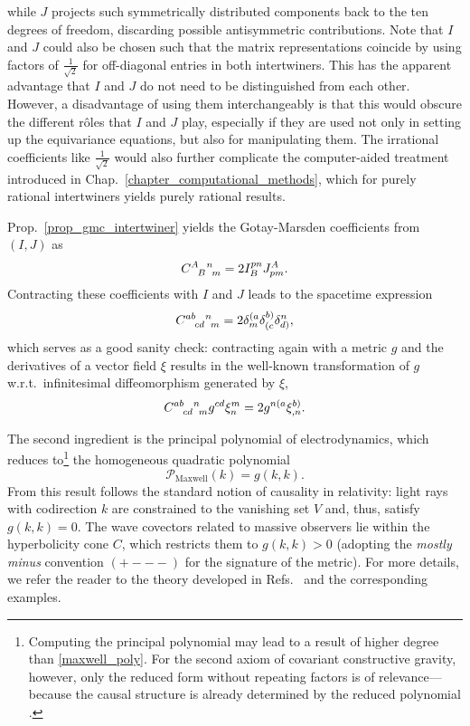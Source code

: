 while $J$ projects such symmetrically distributed components back to the ten degrees of freedom, discarding possible antisymmetric contributions. Note that $I$ and $J$ could also be chosen such that the matrix representations coincide by using factors of $\frac{1}{\sqrt 2}$ for off-diagonal entries in both intertwiners. This has the apparent advantage that $I$ and $J$ do not need to be distinguished from each other. However, a disadvantage of using them interchangeably is that this would obscure the different r\^oles that $I$ and $J$ play, especially if they are used not only in setting up the equivariance equations, but also for manipulating them. The irrational coefficients like $\frac{1}{\sqrt 2}$ would also further complicate the computer-aided treatment introduced in Chap.~\ref{chapter_computational_methods}, which for purely rational intertwiners yields purely rational results.

Prop.~\ref{prop_gmc_intertwiner} yields the Gotay-Marsden coefficients from $(I,J)$ as
\begin{equation}\label{gmc_metric}
  \gmc{A}{B}{n}{m} = 2 I^{pn}_B J^A_{pm}.
\end{equation}
Contracting these coefficients with $I$ and $J$ leads to the spacetime expression
\begin{equation}
  \gmc{ab}{cd}{n}{m} = 2 \delta^{(a}_m \delta^{b)}_{(c} \delta^n_{d)},
\end{equation}
which serves as a good sanity check: contracting again with a metric $g$ and the derivatives of a vector field $\xi$ results in the well-known transformation of $g$ w.r.t.\ infinitesimal diffeomorphism generated by $\xi$,
\begin{equation}
  \gmc{ab}{cd}{n}{m} g^{cd} \xi^m_n = 2g^{n(a} \xi^{b)}_{,n}.
\end{equation}

The second ingredient is the principal polynomial of electrodynamics, which reduces to\footnote{Computing the principal polynomial may lead to a result of higher degree than \eqref{maxwell_poly}. For the second axiom of covariant constructive gravity, however, only the reduced form without repeating factors is of relevance---because the causal structure is already determined by the reduced polynomial \cite{R_tzel_2011}.} the homogeneous quadratic polynomial \cite{R_tzel_2011}
\begin{equation}\label{maxwell_poly}
  \mathcal P_\text{Maxwell}(k) = g(k,k).
\end{equation}
From this result follows the standard notion of causality in relativity: light rays with codirection $k$ are constrained to the vanishing set $V$ and, thus, satisfy $g(k,k)=0$. The wave covectors related to massive observers lie within the hyperbolicity cone $C$, which restricts them to $g(k,k) > 0$ (adopting the \emph{mostly minus} convention $(+---)$ for the signature of the metric). For more details, we refer the reader to the theory developed in Refs.\ \cite{R_tzel_2011,Rivera_2012,Giesel_2012,D_ll_2018} and the corresponding examples.

